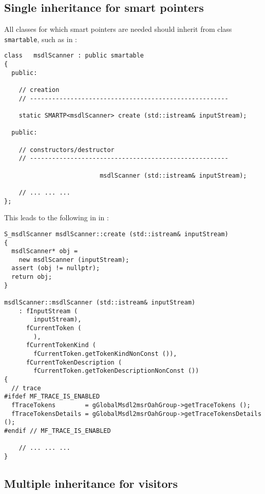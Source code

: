 \subsection{Single inheritance for smart pointers}

All classes for which smart pointers are needed should inherit from class   {\tt smartable}, such as in :
\begin{lstlisting}[language=CPlusPlus]
class   msdlScanner : public smartable
{
  public:

    // creation
    // ------------------------------------------------------

    static SMARTP<msdlScanner> create (std::istream& inputStream);

  public:

    // constructors/destructor
    // ------------------------------------------------------

                          msdlScanner (std::istream& inputStream);

	// ... ... ...
};
\end{lstlisting}

This leads to the following in in :
\begin{lstlisting}[language=CPlusPlus]
S_msdlScanner msdlScanner::create (std::istream& inputStream)
{
  msdlScanner* obj =
    new msdlScanner (inputStream);
  assert (obj != nullptr);
  return obj;
}

msdlScanner::msdlScanner (std::istream& inputStream)
    : fInputStream (
        inputStream),
      fCurrentToken (
        ),
      fCurrentTokenKind (
        fCurrentToken.getTokenKindNonConst ()),
      fCurrentTokenDescription (
        fCurrentToken.getTokenDescriptionNonConst ())
{
  // trace
#ifdef MF_TRACE_IS_ENABLED
  fTraceTokens        = gGlobalMsdl2msrOahGroup->getTraceTokens ();
  fTraceTokensDetails = gGlobalMsdl2msrOahGroup->getTraceTokensDetails ();
#endif // MF_TRACE_IS_ENABLED

	// ... ... ...
}
\end{lstlisting}


\subsection{Multiple inheritance for visitors}

